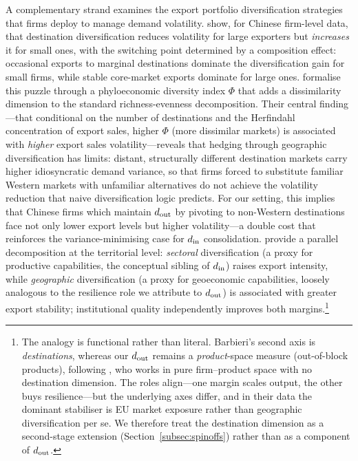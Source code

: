 A complementary strand examines the export portfolio diversification strategies that
firms deploy to manage demand volatility. \citet{vannoorenberghe2016} show, for
Chinese firm-level data, that destination diversification reduces volatility for large
exporters but \emph{increases} it for small ones, with the switching point determined
by a composition effect: occasional exports to marginal destinations dominate the
diversification gain for small firms, while stable core-market exports dominate for
large ones. \citet{crozet2025} formalise this puzzle through a phyloeconomic diversity
index $\Phi$ that adds a dissimilarity dimension to the standard richness-evenness
decomposition. Their central finding---that conditional on the number of destinations
and the Herfindahl concentration of export sales, higher $\Phi$ (more dissimilar
markets) is associated with \emph{higher} export sales volatility---reveals that
hedging through geographic diversification has limits: distant, structurally different
destination markets carry higher idiosyncratic demand variance, so that firms forced
to substitute familiar Western markets with unfamiliar alternatives do not achieve
the volatility reduction that naive diversification logic predicts. For our setting,
this implies that Chinese firms which maintain $d_{\rm out}$ by pivoting to non-Western
destinations face not only lower export levels but higher volatility---a double cost
that reinforces the variance-minimising case for $d_{\rm in}$ consolidation.
\citet{barbieri2024} provide a parallel decomposition at the territorial level:
\emph{sectoral} diversification (a proxy for productive capabilities, the conceptual
sibling of $d_{\rm in}$) raises export intensity, while \emph{geographic}
diversification (a proxy for geoeconomic capabilities, loosely analogous to the
resilience role we attribute to $d_{\rm out}$) is associated with greater export
stability; institutional quality independently improves both margins.\footnote{The
analogy is functional rather than literal. Barbieri's second axis is
\emph{destinations}, whereas our $d_{\rm out}$ remains a \emph{product}-space
measure (out-of-block products), following \citet{destefano2025}, who works in pure
firm--product space with no destination dimension. The roles align---one margin scales
output, the other buys resilience---but the underlying axes differ, and in their data
the dominant stabiliser is EU market exposure rather than geographic diversification
per se. We therefore treat the destination dimension as a second-stage extension
(Section~\ref{subsec:spinoffs}) rather than as a component of $d_{\rm out}$.}

